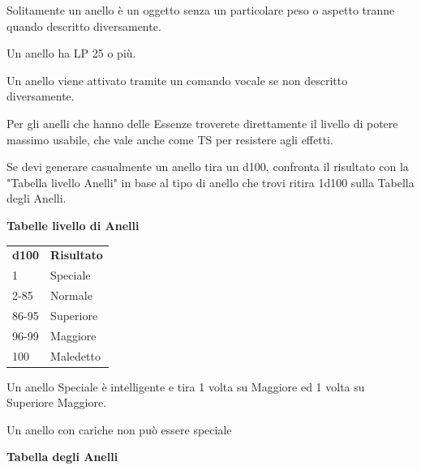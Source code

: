 \documentclass[a4paper,11pt,twoside,openany]{book}
\begin{document}
Solitamente un anello è un oggetto senza un particolare peso o aspetto tranne quando descritto diversamente.

Un anello ha LP 25 o più.

Un anello viene attivato tramite un comando vocale se non descritto diversamente.

Per gli anelli che hanno delle Essenze troverete direttamente il livello di potere massimo usabile, che vale anche come TS per resistere agli effetti.

Se devi generare casualmente un anello tira un d100, confronta il risultato con la "Tabella livello Anelli" in base al tipo di anello che trovi ritira 1d100 sulla Tabella degli Anelli.

\bigskip

\textbf{Tabelle livello di Anelli}

\medskip
\begin{tabular}{ll}
	\toprule
	\textbf{d100} & \textbf{Risultato}\tabularnewline
	1             & Speciale\tabularnewline
	2-85          & Normale\tabularnewline
	86-95         & Superiore\tabularnewline
	96-99         & Maggiore\tabularnewline
	100           & Maledetto\tabularnewline
\end{tabular}

\bigskip

Un anello Speciale è intelligente e tira 1 volta su Maggiore ed 1 volta su Superiore Maggiore.

Un anello con cariche non può essere speciale

\pagebreak

\textbf{Tabella degli Anelli}

\medskip
\end{document}
